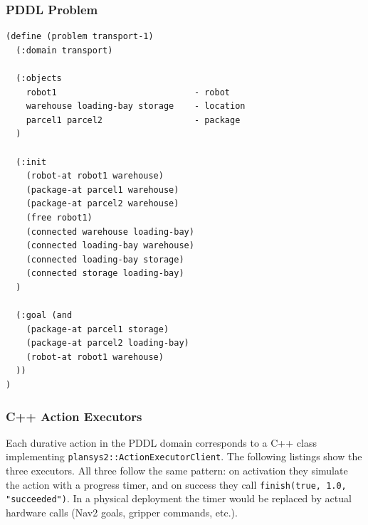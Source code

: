 \documentclass[12pt,a4paper]{article}
\theoremstyle{definition}
\theoremstyle{plain}
\begin{document}
\subsubsection{PDDL Problem}

\begin{lstlisting}[language={}, caption={PDDL problem instance
(\texttt{pddl/transport\_problem.pddl}).}, label=lst:pddlproblem]
(define (problem transport-1)
  (:domain transport)

  (:objects
    robot1                           - robot
    warehouse loading-bay storage    - location
    parcel1 parcel2                  - package
  )

  (:init
    (robot-at robot1 warehouse)
    (package-at parcel1 warehouse)
    (package-at parcel2 warehouse)
    (free robot1)
    (connected warehouse loading-bay)
    (connected loading-bay warehouse)
    (connected loading-bay storage)
    (connected storage loading-bay)
  )

  (:goal (and
    (package-at parcel1 storage)
    (package-at parcel2 loading-bay)
    (robot-at robot1 warehouse)
  ))
)
\end{lstlisting}

\subsubsection{C++ Action Executors}

Each durative action in the PDDL domain corresponds to a C++ class implementing
\texttt{plansys2::ActionExecutorClient}. The following listings show the three executors. All
three follow the same pattern: on activation they simulate the action with a progress timer, and
on success they call \texttt{finish(true, 1.0, "succeeded")}. In a physical deployment the
timer would be replaced by actual hardware calls (Nav2 goals, gripper commands, etc.).
\end{document}
